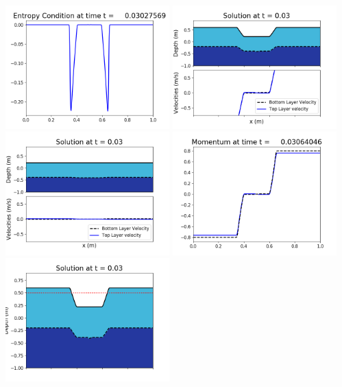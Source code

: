 \documentclass[11pt]{article}
\begin{document}
\vskip 10pt 
\includegraphics[width=0.475\textwidth]{frame0084fig1009.png}
\vskip 10pt 
\includegraphics[width=0.475\textwidth]{frame0085fig1001.png}
\includegraphics[width=0.475\textwidth]{frame0085fig1002.png}
\vskip 10pt 
\includegraphics[width=0.475\textwidth]{frame0085fig1003.png}
\includegraphics[width=0.475\textwidth]{frame0085fig1006.png}
\end{document}
